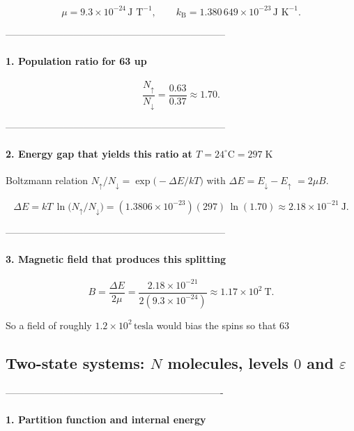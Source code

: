 \documentclass[12pt]{article}
\theoremstyle{definition} %
\theoremstyle{plain} %
\begin{document}
\[
  \mu = 9.3\times10^{-24}\,\text{J T}^{-1},
  \qquad
  k_{\mathrm B}=1.380\,649\times10^{-23}\,\text{J K}^{-1}.
\]

--------------------------------------------------------------------
\paragraph{1.  Population ratio for 63  up}

\[
  \frac{N_\uparrow}{N_\downarrow}
  = \frac{0.63}{0.37}
  \approx \boxed{1.70}.
\]

--------------------------------------------------------------------
\paragraph{2.  Energy gap that yields this ratio at \(T = 24^{\circ}\text{C}=297\;\text{K}\)}

Boltzmann relation  
\(N_\uparrow/N_\downarrow = \exp\bigl(-\Delta E/kT\bigr)\) with  
\(\Delta E = E_\downarrow-E_\uparrow\) \(= 2\mu B\).

\[
  \Delta E
  = kT\,\ln\!\bigl(N_\uparrow/N_\downarrow\bigr)
  = (1.3806\times10^{-23})(297)\,\ln(1.70)
  \approx \boxed{2.18\times10^{-21}\ \text{J}}.
\]

--------------------------------------------------------------------
\paragraph{3.  Magnetic field that produces this splitting}

\[
  B = \frac{\Delta E}{2\mu}
    = \frac{2.18\times10^{-21}}{2(9.3\times10^{-24})}
    \approx \boxed{1.17\times10^{2}\ \text{T}}.
\]

\bigskip
So a field of roughly \(1.2\times10^{2}\,\text{tesla}\) would bias the spins so that 63 %

\subsection*{Two-state systems: \(N\) molecules, levels \(0\) and \(\varepsilon\)}

-------------------------------------------------------------------
\paragraph{1.  Partition function and internal energy}
\end{document}
